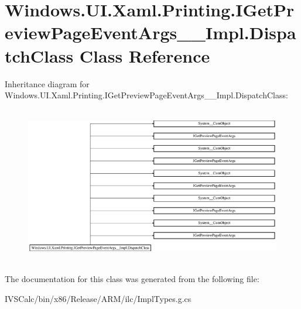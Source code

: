 \hypertarget{class_windows_1_1_u_i_1_1_xaml_1_1_printing_1_1_i_get_preview_page_event_args_____impl_1_1_dispatch_class}{}\section{Windows.\+U\+I.\+Xaml.\+Printing.\+I\+Get\+Preview\+Page\+Event\+Args\+\_\+\+\_\+\+Impl.\+Dispatch\+Class Class Reference}
\label{class_windows_1_1_u_i_1_1_xaml_1_1_printing_1_1_i_get_preview_page_event_args_____impl_1_1_dispatch_class}
Inheritance diagram for Windows.\+U\+I.\+Xaml.\+Printing.\+I\+Get\+Preview\+Page\+Event\+Args\+\_\+\+\_\+\+Impl.\+Dispatch\+Class\+:\begin{figure}[H]
\begin{center}
\leavevmode
\includegraphics[height=6.936937cm]{class_windows_1_1_u_i_1_1_xaml_1_1_printing_1_1_i_get_preview_page_event_args_____impl_1_1_dispatch_class}
\end{center}
\end{figure}


The documentation for this class was generated from the following file\+:\begin{DoxyCompactItemize}
\item 
I\+V\+S\+Calc/bin/x86/\+Release/\+A\+R\+M/ilc/Impl\+Types.\+g.\+cs\end{DoxyCompactItemize}
